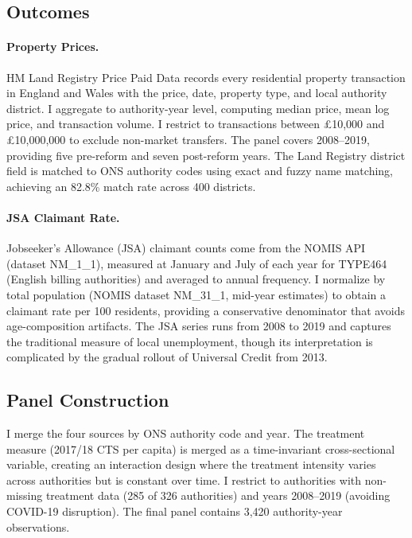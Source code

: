 \documentclass[12pt]{article}
\begin{document}
\subsection{Outcomes}

\paragraph{Property Prices.} HM Land Registry Price Paid Data records every residential property transaction in England and Wales with the price, date, property type, and local authority district. I aggregate to authority-year level, computing median price, mean log price, and transaction volume. I restrict to transactions between \pounds10,000 and \pounds10,000,000 to exclude non-market transfers. The panel covers 2008--2019, providing five pre-reform and seven post-reform years. The Land Registry district field is matched to ONS authority codes using exact and fuzzy name matching, achieving an 82.8\% match rate across 400 districts.

\paragraph{JSA Claimant Rate.} Jobseeker's Allowance (JSA) claimant counts come from the NOMIS API (dataset NM\_1\_1), measured at January and July of each year for TYPE464 (English billing authorities) and averaged to annual frequency. I normalize by total population (NOMIS dataset NM\_31\_1, mid-year estimates) to obtain a claimant rate per 100 residents, providing a conservative denominator that avoids age-composition artifacts. The JSA series runs from 2008 to 2019 and captures the traditional measure of local unemployment, though its interpretation is complicated by the gradual rollout of Universal Credit from 2013.

\subsection{Panel Construction}

I merge the four sources by ONS authority code and year. The treatment measure (2017/18 CTS per capita) is merged as a time-invariant cross-sectional variable, creating an interaction design where the treatment intensity varies across authorities but is constant over time. I restrict to authorities with non-missing treatment data (285 of 326 authorities) and years 2008--2019 (avoiding COVID-19 disruption). The final panel contains 3,420 authority-year observations.
\end{document}
